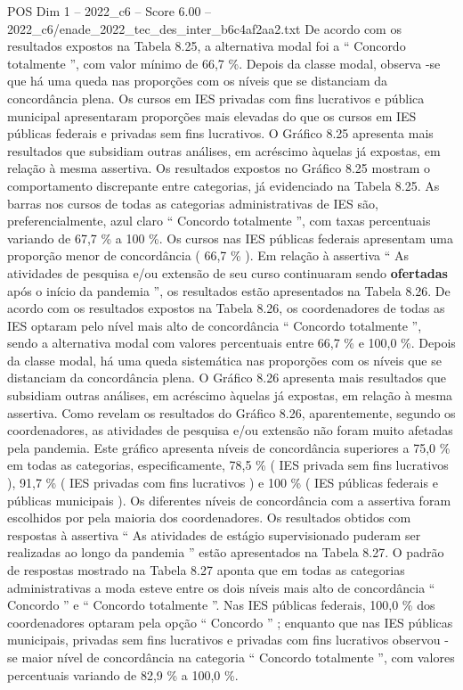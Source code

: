 \begin{textsample}{POS Dim 1 – 2022\_c6 – Score 6.00 – 2022\_c6/enade\_2022\_tec\_des\_inter\_b6c4af2aa2.txt}
De acordo com os resultados expostos na Tabela 8.25, a alternativa modal foi a “ Concordo totalmente ”, com valor mínimo de 66,7 \%.
Depois da classe modal, observa -se que há uma queda nas proporções com os níveis que se distanciam da concordância plena.
Os cursos em IES privadas com fins lucrativos e pública municipal apresentaram proporções mais elevadas do que os cursos em IES públicas federais e privadas sem fins lucrativos.
O Gráfico 8.25 apresenta mais resultados que subsidiam outras análises, em acréscimo àquelas já expostas, em relação à mesma assertiva.
Os resultados expostos no Gráfico 8.25 mostram o comportamento discrepante entre categorias, já evidenciado na Tabela 8.25.
As barras nos cursos de todas as categorias administrativas de IES são, preferencialmente, azul claro “ Concordo totalmente ”, com taxas percentuais variando de 67,7 \% a 100 \%.
Os cursos nas IES públicas federais apresentam uma proporção menor de concordância ( 66,7 \% ).
Em relação à assertiva “ As atividades de pesquisa e/ou extensão de seu curso continuaram sendo \textbf{ofertadas} após o início da pandemia ”, os resultados estão apresentados na Tabela 8.26.
De acordo com os resultados expostos na Tabela 8.26, os coordenadores de todas as IES optaram pelo nível mais alto de concordância “ Concordo totalmente ”, sendo a alternativa modal com valores percentuais entre 66,7 \% e 100,0 \%.
Depois da classe modal, há uma queda sistemática nas proporções com os níveis que se distanciam da concordância plena.
O Gráfico 8.26 apresenta mais resultados que subsidiam outras análises, em acréscimo àquelas já expostas, em relação à mesma assertiva.
Como revelam os resultados do Gráfico 8.26, aparentemente, segundo os coordenadores, as atividades de pesquisa e/ou extensão não foram muito afetadas pela pandemia.
Este gráfico apresenta níveis de concordância superiores a 75,0 \% em todas as categorias, especificamente, 78,5 \% ( IES privada sem fins lucrativos ), 91,7 \% ( IES privadas com fins lucrativos ) e 100 \% ( IES públicas federais e públicas municipais ).
Os diferentes níveis de concordância com a assertiva foram escolhidos por pela maioria dos coordenadores.
Os resultados obtidos com respostas à assertiva “ As atividades de estágio supervisionado puderam ser realizadas ao longo da pandemia ” estão apresentados na Tabela 8.27.
O padrão de respostas mostrado na Tabela 8.27 aponta que em todas as categorias administrativas a moda esteve entre os dois níveis mais alto de concordância “ Concordo ” e “ Concordo totalmente ”.
Nas IES públicas federais, 100,0 \% dos coordenadores optaram pela opção “ Concordo ” ; enquanto que nas IES públicas municipais, privadas sem fins lucrativos e privadas com fins lucrativos observou -se maior nível de concordância na categoria “ Concordo totalmente ”, com valores percentuais variando de 82,9 \% a 100,0 \%.

\end{textsample}
